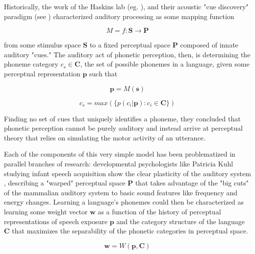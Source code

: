 Historically, the work of the Haskins lab (eg. \cite{schertzPhoneticCueWeighting2020}), and their acoustic "cue discovery" paradigm (see \cite[p.~51]{ohalaGuideHistoryPhonetic1999}) characterized auditory processing as some mapping function 

\begin{equation}
\label{eqn:map}
M = f: \mathbf{S} \to \mathbf{P}
\end{equation} 

from some stimulus space $\mathbf{S}$ to a fixed\cite{Liberman1985a} perceptual space $\mathbf{P}$ composed of innate auditory "cues." The auditory act of phonetic perception, then, is determining the phoneme category $c_s \in \mathbf{C}$, the set of possible phonemes in a language, given some perceptual representation $\mathbf{p}$ such that

\begin{equation}
\label{eqn:pfroms}
\mathbf{p} = M(\mathbf{s})
\end{equation}

\begin{equation}
\label{eqn:infer}
c_s = max( \{ p(c_i | \mathbf{p}) : c_i \in \mathbf{C} \})
\end{equation}

Finding no set of cues that uniquely identifies a phoneme, they concluded that phonetic perception cannot be purely auditory and instead arrive at perceptual theory that relies on simulating the motor activity of an utterance\cite{Liberman1985a}. 

Each of the components of this very simple model has been problematized in parallel branches of research: developmental psychologists like Patricia Kuhl studying infant speech acquisition show the clear plasticity of the auditory system \cite{kuhlEarlyLanguageAcquisition2004}, describing a "warped" perceptual space $\mathbf{P}$ that takes advantage of the "big cuts" of the mammalian auditory system to basic sound features like frequency and energy changes. Learning a language's phonemes could then be characterized as learning some weight vector $\mathbf{w}$ as a function of the history of perceptual representations of speech exposure $\mathbf{p}$ and the category structure of the language $\mathbf{C}$ that maximizes the separability of the phonetic categories in perceptual space. 

\begin{equation}
\label{eqn:w}
\mathbf{w} = W(\mathbf{p}, \mathbf{C})
\end{equation}

